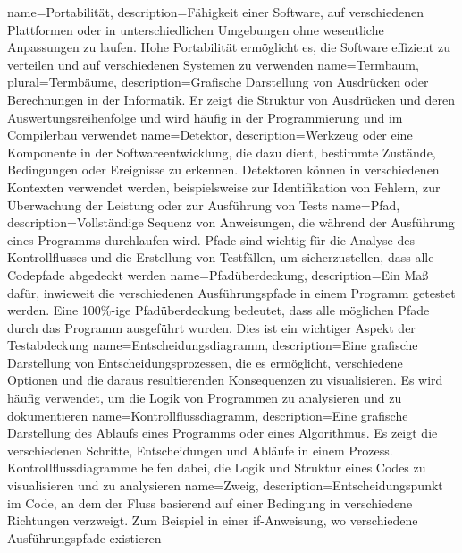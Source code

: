 {
    name={Portabilität},
    description={Fähigkeit einer Software, auf verschiedenen Plattformen oder in unterschiedlichen Umgebungen ohne wesentliche Anpassungen zu laufen. Hohe Portabilität ermöglicht es, die Software effizient zu verteilen und auf verschiedenen Systemen zu verwenden}
}
{
    name={Termbaum},
    plural={Termbäume},
    description={Grafische Darstellung von Ausdrücken oder Berechnungen in der Informatik. Er zeigt die Struktur von Ausdrücken und deren Auswertungsreihenfolge und wird häufig in der Programmierung und im Compilerbau verwendet}
}
{
    name={Detektor},
    description={Werkzeug oder eine Komponente in der Softwareentwicklung, die dazu dient, bestimmte Zustände, Bedingungen oder Ereignisse zu erkennen. Detektoren können in verschiedenen Kontexten verwendet werden, beispielsweise zur Identifikation von Fehlern, zur Überwachung der Leistung oder zur Ausführung von Tests}
}
{
    name={Pfad},
    description={Vollständige Sequenz von Anweisungen, die während der Ausführung eines Programms durchlaufen wird. Pfade sind wichtig für die Analyse des Kontrollflusses und die Erstellung von Testfällen, um sicherzustellen, dass alle Codepfade abgedeckt werden}
}
{
    name={Pfadüberdeckung},
    description={Ein Maß dafür, inwieweit die verschiedenen Ausführungspfade in einem Programm getestet werden. Eine 100\%-ige Pfadüberdeckung bedeutet, dass alle möglichen Pfade durch das Programm ausgeführt wurden. Dies ist ein wichtiger Aspekt der Testabdeckung}
}
{
    name={Entscheidungsdiagramm},
    description={Eine grafische Darstellung von Entscheidungsprozessen, die es ermöglicht, verschiedene Optionen und die daraus resultierenden Konsequenzen zu visualisieren. Es wird häufig verwendet, um die Logik von Programmen zu analysieren und zu dokumentieren}
}
{
    name={Kontrollflussdiagramm},
    description={Eine grafische Darstellung des Ablaufs eines Programms oder eines Algorithmus. Es zeigt die verschiedenen Schritte, Entscheidungen und Abläufe in einem Prozess. Kontrollflussdiagramme helfen dabei, die Logik und Struktur eines Codes zu visualisieren und zu analysieren}
}
{
    name={Zweig},
    description={Entscheidungspunkt im Code, an dem der Fluss basierend auf einer Bedingung in verschiedene Richtungen verzweigt. Zum Beispiel in einer if-Anweisung, wo verschiedene Ausführungspfade existieren}
}
